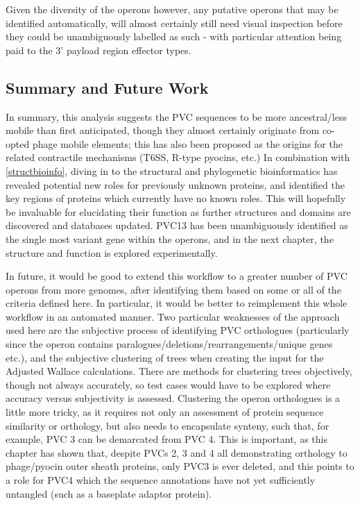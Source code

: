 Given the diversity of the operons however, any putative operons that may be identified automatically, will almost certainly still need visual inspection before they could be unambiguously labelled as such - with particular attention being paid to the 3' payload region effector types.
\newline


\subsection{Summary and Future Work}
In summary, this analysis suggests the PVC sequences to be more ancestral/less mobile than first anticipated, though they almost certainly originate from co-opted phage mobile elements; this has also been proposed as the origins for the related contractile mechanisms (T6SS, R-type pyocins, etc.) In combination with \vref{structbioinfo}, diving in to the structural and phylogenetic bioinformatics has revealed potential new roles for previously unknown proteins, and identified the key regions of proteins which currently have no known roles. This will hopefully be invaluable for elucidating their function as further structures and domains are discovered and databases updated. PVC13 has been unambiguously identified as the single most variant gene within the operons, and in the next chapter, the structure and function is explored experimentally.

In future, it would be good to extend this workflow to a greater number of PVC operons from more genomes, after identifying them based on some or all of the criteria defined here. In particular, it would be better to reimplement this whole workflow in an automated manner. Two particular weaknesses of the approach used here are the subjective process of identifying PVC orthologues (particularly since the operon contains paralogues/deletions/rearrangements/unique genes etc.), and the subjective clustering of trees when creating the input for the Adjusted Wallace calculations. There are methods for clustering trees objectively, though not always accurately, so test cases would have to be explored where accuracy versus subjectivity is assessed. Clustering the operon orthologues is a little more tricky, as it requires not only an assessment of protein sequence similarity or orthology, but also needs to encapsulate synteny, such that, for example, PVC 3 can be demarcated from PVC 4. This is important, as this chapter has shown that, despite PVCs 2, 3 and 4 all demonstrating orthology to phage/pyocin outer sheath proteins, only PVC3 is ever deleted, and this points to a role for PVC4 which the sequence annotations have not yet sufficiently untangled (such as a baseplate adaptor protein). 

